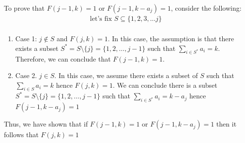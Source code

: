 \documentclass[11pt]{exam}
\begin{document}
\begin{parts}
\begin{customsolutionbox}
            To prove that $F(j-1, k) = 1$ or $F(j-1, k-a_{j}) = 1$, consider the following:
            \begin{gather}
                \text{let's fix } S \subseteq \{1, 2, 3, \ldots j\} \\
            \end{gather}
            \begin{enumerate}
                \item Case 1: $j \not \in S$ and $F(j, k) = 1$. In this case, the assumption is that there exists a subset $S^{*} = S \setminus \{j\} = \{1, 2, \ldots, j-1\}$ such that $\sum_{i \in S^{*}} a_{i} = k$. Therefore, we can conclude that $F(j-1, k) = 1$.
                \item Case 2. $j \in S$. In this case, we assume there exists a subset of $S$ such that $\sum_{i \in S} a_{i} = k$ hence $F(j, k) = 1$. We can conclude there is a subset $S^{*} = S \setminus \{j\} = \{1, 2, \ldots, j-1\}$ such that $\sum_{i \in S^{*}} a_i = k - a_j$ hence  $F(j-1, k-a_j) = 1$
            \end{enumerate}
            Thus, we have shown that if $F(j-1, k) = 1$ or $F(j-1, k-a_j) = 1$ then it follows that $F(j,k) = 1$
        \end{customsolutionbox}
\end{parts}
\end{document}
